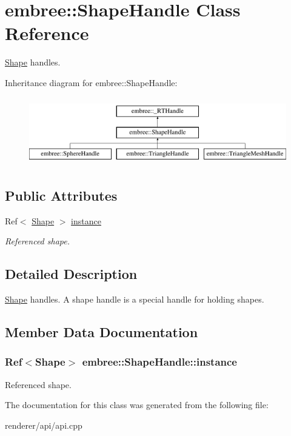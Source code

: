 \hypertarget{classembree_1_1_shape_handle}{
\section{embree::ShapeHandle Class Reference}
\label{classembree_1_1_shape_handle}
}


\hyperlink{classembree_1_1_shape}{Shape} handles.  


Inheritance diagram for embree::ShapeHandle:\begin{figure}[H]
\begin{center}
\leavevmode
\includegraphics[height=3.000000cm]{classembree_1_1_shape_handle}
\end{center}
\end{figure}
\subsection*{Public Attributes}
\begin{DoxyCompactItemize}
\item 
Ref$<$ \hyperlink{classembree_1_1_shape}{Shape} $>$ \hyperlink{classembree_1_1_shape_handle_a29f671894e40bb8977521a1fc9adcda1}{instance}
\begin{DoxyCompactList}\small\item\em Referenced shape. \item\end{DoxyCompactList}\end{DoxyCompactItemize}


\subsection{Detailed Description}
\hyperlink{classembree_1_1_shape}{Shape} handles. A shape handle is a special handle for holding shapes. 

\subsection{Member Data Documentation}
\hypertarget{classembree_1_1_shape_handle_a29f671894e40bb8977521a1fc9adcda1}{
\subsubsection[{instance}]{\setlength{\rightskip}{0pt plus 5cm}Ref$<${\bf Shape}$>$ {\bf embree::ShapeHandle::instance}}}
\label{classembree_1_1_shape_handle_a29f671894e40bb8977521a1fc9adcda1}


Referenced shape. 



The documentation for this class was generated from the following file:\begin{DoxyCompactItemize}
\item 
renderer/api/api.cpp\end{DoxyCompactItemize}
